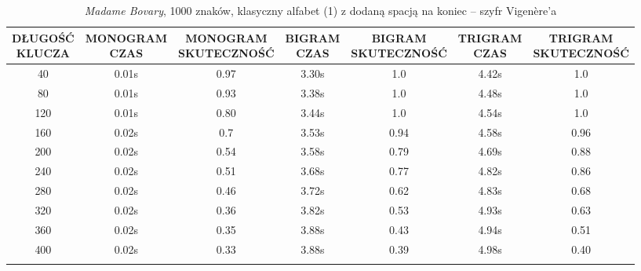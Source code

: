 \documentclass[a4paper]{article}
\theoremstyle{defn}
\theoremstyle{theorem}
\theoremstyle{lemma}
\theoremstyle{cor}
\theoremstyle{fact}
\begin{document}
\begin{center}\begin{small}\begin{longtable}{|c|c|c|c|c|c|c|} 
\hline \makecell{DŁUGOŚĆ\\KLUCZA} &  \makecell{MONOGRAM\\CZAS} & \makecell{MONOGRAM\\SKUTECZNOŚĆ} & \makecell{BIGRAM\\CZAS} &  \makecell{BIGRAM\\SKUTECZNOŚĆ} & \makecell{TRIGRAM\\CZAS} & \makecell{TRIGRAM\\SKUTECZNOŚĆ}\\ \hline 
40 & 0.01s & 0.97 & 3.30s & 1.0 & 4.42s & 1.0 \\ \hline 
80 & 0.01s & 0.93 & 3.38s & 1.0 & 4.48s & 1.0 \\ \hline 
120 & 0.01s & 0.80 & 3.44s & 1.0 & 4.54s & 1.0 \\ \hline 
160 & 0.02s & 0.7 & 3.53s & 0.94 & 4.58s & 0.96 \\ \hline 
200 & 0.02s & 0.54 & 3.58s & 0.79 & 4.69s & 0.88 \\ \hline 
240 & 0.02s & 0.51 & 3.68s & 0.77 & 4.82s & 0.86 \\ \hline 
280 & 0.02s & 0.46 & 3.72s & 0.62 & 4.83s & 0.68 \\ \hline 
320 & 0.02s & 0.36 & 3.82s & 0.53 & 4.93s & 0.63 \\ \hline 
360 & 0.02s & 0.35 & 3.88s & 0.43 & 4.94s & 0.51 \\ \hline 
400 & 0.02s & 0.33 & 3.88s & 0.39 & 4.98s & 0.40 \\ \hline
\caption{\textit{Madame Bovary}, 1000 znaków, klasyczny alfabet (1) z dodaną spacją na koniec – szyfr Vigenère'a}
\end{longtable}\end{small}\end{center} 
\end{document}
